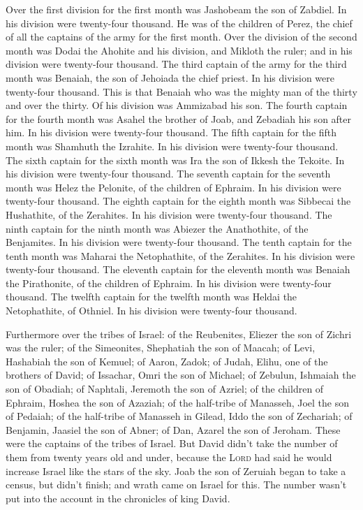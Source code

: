 Over the first division for the first month was Jashobeam
the son of Zabdiel. In his division were twenty-four thousand.
 He was of the children of Perez, the chief of all the
captains of the army for the first month.  Over the
division of the second month was Dodai the Ahohite and his division, and
Mikloth the ruler; and in his division were twenty-four thousand.
 The third captain of the army for the third month was
Benaiah, the son of Jehoiada the chief priest. In his division were
twenty-four thousand.  This is that Benaiah who was the
mighty man of the thirty and over the thirty. Of his division was
Ammizabad his son.  The fourth captain for the fourth
month was Asahel the brother of Joab, and Zebadiah his son after him. In
his division were twenty-four thousand.  The fifth captain
for the fifth month was Shamhuth the Izrahite. In his division were
twenty-four thousand.  The sixth captain for the sixth
month was Ira the son of Ikkesh the Tekoite. In his division were
twenty-four thousand.  The seventh captain for the
seventh month was Helez the Pelonite, of the children of Ephraim. In his
division were twenty-four thousand.  The eighth captain
for the eighth month was Sibbecai the Hushathite, of the Zerahites. In
his division were twenty-four thousand.  The ninth
captain for the ninth month was Abiezer the Anathothite, of the
Benjamites. In his division were twenty-four thousand. 
The tenth captain for the tenth month was Maharai the Netophathite, of
the Zerahites. In his division were twenty-four thousand.
 The eleventh captain for the eleventh month was Benaiah
the Pirathonite, of the children of Ephraim. In his division were
twenty-four thousand.  The twelfth captain for the
twelfth month was Heldai the Netophathite, of Othniel. In his division
were twenty-four thousand.

 Furthermore over the tribes of Israel: of the
Reubenites, Eliezer the son of Zichri was the ruler; of the Simeonites,
Shephatiah the son of Maacah;  of Levi, Hashabiah the son
of Kemuel; of Aaron, Zadok;  of Judah, Elihu, one of the
brothers of David; of Issachar, Omri the son of Michael; 
of Zebulun, Ishmaiah the son of Obadiah; of Naphtali, Jeremoth the son
of Azriel;  of the children of Ephraim, Hoshea the son of
Azaziah; of the half-tribe of Manasseh, Joel the son of Pedaiah;
 of the half-tribe of Manasseh in Gilead, Iddo the son of
Zechariah; of Benjamin, Jaasiel the son of Abner;  of
Dan, Azarel the son of Jeroham. These were the captains of the tribes of
Israel.  But David didn't take the number of them from
twenty years old and under, because the \textsc{Lord} had said he would
increase Israel like the stars of the sky.  Joab the son
of Zeruiah began to take a census, but didn't finish; and wrath came on
Israel for this. The number wasn't put into the account in the
chronicles of king David.

